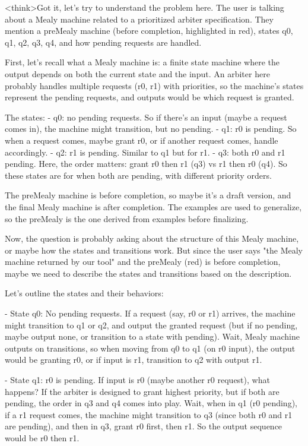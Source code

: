 <think>Got it, let's try to understand the problem here. The user is talking about a Mealy machine related to a prioritized arbiter specification. They mention a preMealy machine (before completion, highlighted in red), states q0, q1, q2, q3, q4, and how pending requests are handled. 

First, let's recall what a Mealy machine is: a finite state machine where the output depends on both the current state and the input. An arbiter here probably handles multiple requests (r0, r1) with priorities, so the machine's states represent the pending requests, and outputs would be which request is granted.

The states:
- q0: no pending requests. So if there's an input (maybe a request comes in), the machine might transition, but no pending.
- q1: r0 is pending. So when a request comes, maybe grant r0, or if another request comes, handle accordingly.
- q2: r1 is pending. Similar to q1 but for r1.
- q3: both r0 and r1 pending. Here, the order matters: grant r0 then r1 (q3) vs r1 then r0 (q4). So these states are for when both are pending, with different priority orders.

The preMealy machine is before completion, so maybe it's a draft version, and the final Mealy machine is after completion. The examples are used to generalize, so the preMealy is the one derived from examples before finalizing.

Now, the question is probably asking about the structure of this Mealy machine, or maybe how the states and transitions work. But since the user says "the Mealy machine returned by our tool" and the preMealy (red) is before completion, maybe we need to describe the states and transitions based on the description.

Let's outline the states and their behaviors:

- State q0: No pending requests. If a request (say, r0 or r1) arrives, the machine might transition to q1 or q2, and output the granted request (but if no pending, maybe output none, or transition to a state with pending). Wait, Mealy machine outputs on transitions, so when moving from q0 to q1 (on r0 input), the output would be granting r0, or if input is r1, transition to q2 with output r1.

- State q1: r0 is pending. If input is r0 (maybe another r0 request), what happens? If the arbiter is designed to grant highest priority, but if both are pending, the order in q3 and q4 comes into play. Wait, when in q1 (r0 pending), if a r1 request comes, the machine might transition to q3 (since both r0 and r1 are pending), and then in q3, grant r0 first, then r1. So the output sequence would be r0 then r1.

